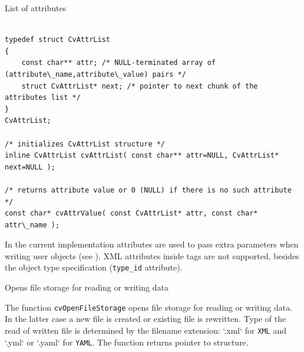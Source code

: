 \label{CvAttrList}

List of attributes

\begin{lstlisting}

typedef struct CvAttrList
{
    const char** attr; /* NULL-terminated array of (attribute\_name,attribute\_value) pairs */
    struct CvAttrList* next; /* pointer to next chunk of the attributes list */
}
CvAttrList;

/* initializes CvAttrList structure */
inline CvAttrList cvAttrList( const char** attr=NULL, CvAttrList* next=NULL );

/* returns attribute value or 0 (NULL) if there is no such attribute */
const char* cvAttrValue( const CvAttrList* attr, const char* attr\_name );

\end{lstlisting}

In the current implementation attributes are used to pass extra parameters when writing user objects (see ). XML attributes inside tags are not supported, besides the object type specification (\texttt{type\_id} attribute).

\label{OpenFileStorage}

Opens file storage for reading or writing data


\begin{description}
\end{description}

The function \texttt{cvOpenFileStorage} opens file storage for
reading or writing data. In the latter case a new file is created
or existing file is rewritten. Type of the read of written file is
determined by the filename extension: `.xml` for \texttt{XML}
and `.yml` or `.yaml` for \texttt{YAML}. The function
returns pointer to  structure.


